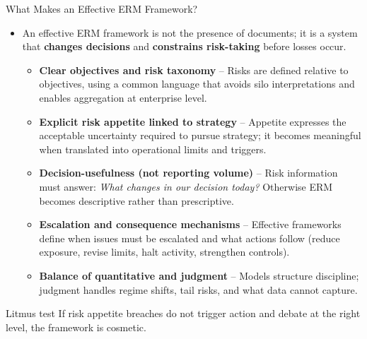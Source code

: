 \documentclass[aspectratio=169, 10pt]{beamer} %
\begin{document}
\begin{frame}{What Makes an Effective ERM Framework?}

\begin{itemize}
\item An effective ERM framework is not the presence of documents; it is a system
that \textbf{changes decisions} and \textbf{constrains risk-taking} before losses occur.

\begin{itemize}
  \item[$\bullet$] \textbf{Clear objectives and risk taxonomy} --
  Risks are defined relative to objectives, using a common language that avoids
  silo interpretations and enables aggregation at enterprise level.

  \item[$\bullet$] \textbf{Explicit risk appetite linked to strategy} --
  Appetite expresses the acceptable uncertainty required to pursue strategy;
  it becomes meaningful when translated into operational limits and triggers.

  \item[$\bullet$] \textbf{Decision-usefulness (not reporting volume)} --
  Risk information must answer: \emph{What changes in our decision today?}
  Otherwise ERM becomes descriptive rather than prescriptive.

  \item[$\bullet$] \textbf{Escalation and consequence mechanisms} --
  Effective frameworks define when issues must be escalated and what actions
  follow (reduce exposure, revise limits, halt activity, strengthen controls).

  \item[$\bullet$] \textbf{Balance of quantitative and judgment} --
  Models structure discipline; judgment handles regime shifts, tail risks, and
  what data cannot capture.
\end{itemize}
\end{itemize}

\begin{block}{Litmus test}
If risk appetite breaches do not trigger action and debate at the right level,
the framework is cosmetic.
\end{block}

\end{frame}
\end{document}
